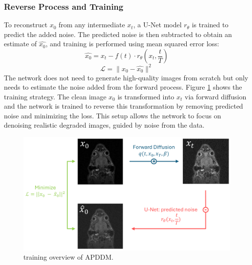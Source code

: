 \documentclass[twocolumn]{article}
\begin{document}
\subsubsection{Reverse Process and Training}
To reconstruct $x_0$ from any intermediate $x_t$, a U-Net model $r_{\theta}$ is trained to predict the added noise. 
The predicted noise is then subtracted to obtain an estimate of $\hat{x_0}$, and training is performed using mean squared error loss: 
\begin{equation}\label{eq:Markov chain}
    \hat{x_0}=x_t-f(t) \cdot r_{\theta}(x_t,\frac{t}{T})
\end{equation}
\begin{equation}
    \mathcal{L}=\|x_0-\hat{x_0}\|^2
\end{equation}
The network does not need to generate high-quality images from scratch but only needs to estimate the noise added from the forward process. 
Figure \ref{fig:APDDM} shows the training strategy. The clean image $x_0$ is transformed into $x_t$ via forward diffusion and the network is trained to reverse this transformation by removing predicted noise and minimizing the loss. 
This setup allows the network to focus on denoising realistic degraded images, guided by noise from the data.

\begin{figure}[H]
    \centering
    \includegraphics[width=1\linewidth]{full APDDM .png}
    \caption{training overview of APDDM.}
    \label{fig:APDDM}
\end{figure}
\end{document}
